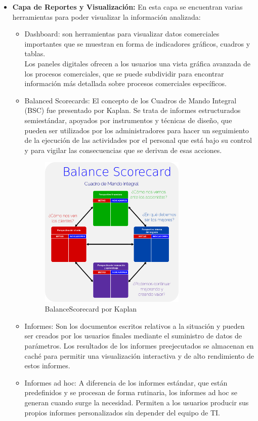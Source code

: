 \documentclass[preprint,12pt]{elsarticle}
\begin{document}
\begin{itemize}
		\item \textbf{Capa de Reportes y Visualización:} En esta capa se encuentran varias herramientas para poder visualizar la información analizada:
		\begin{itemize}
		\item Dashboard: son herramientas para visualizar datos comerciales importantes que se muestran en forma de indicadores gráficos, cuadros y tablas. \\Los paneles digitales ofrecen a los usuarios una vista gráfica avanzada de los procesos comerciales, que se puede subdividir para encontrar información más detallada sobre procesos comerciales específicos.
		\item Balanced Scorecards: El concepto de los Cuadros de Mando Integral (BSC) fue presentado por Kaplan. Se trata de informes estructurados semiestándar, apoyados por instrumentos y técnicas de diseño, que pueden ser utilizados por los administradores para hacer un seguimiento de la ejecución de las actividades por el personal que está bajo su control y para vigilar las consecuencias que se derivan de esas acciones. 
\begin{figure}[htb]
	\begin{center}
		\includegraphics[width=7cm]{./IMAGENES/BalanceScorecard} 
		\caption{BalanceScorecard por Kaplan}
	\end{center}
\end{figure}


		\item Informes: Son los documentos escritos relativos a la situación y pueden ser creados por los usuarios finales mediante el suministro de datos de parámetros. Los resultados de los informes preejecutados se almacenan en caché para permitir una visualización interactiva y de alto rendimiento de estos informes.
		\item Informes ad hoc: A diferencia de los informes estándar, que están predefinidos y se procesan de forma rutinaria, los informes ad hoc se generan cuando surge la necesidad. Permiten a los usuarios producir sus propios informes personalizados sin depender del equipo de TI.
		\end{itemize}

	\end{itemize}
\cite{referenciajohanna1}
\end{document}
